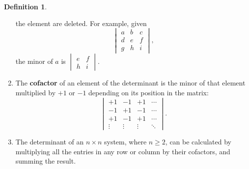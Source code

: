 \documentclass[a4paper,leqno]{article}
\numberwithin{equation}{section}
\theoremstyle{definition}
\newtheorem{defn}[equation]{Definition}
\theoremstyle{remark}
\newcommand{\df}[1]{\textbf{#1}}
\begin{document}
\begin{defn}
\begin{enumerate}
          the element are deleted. For example, given
          \begin{equation}
            \begin{vmatrix}
              a & b & c \\ d & e & f \\ g & h & i
            \end{vmatrix},
          \end{equation}
          the minor of $ a $ is $ \begin{vmatrix} e & f \\ h & i \end{vmatrix} $.
    \item The \df{cofactor} of an element of the determinant is the minor of that element multiplied by $ +1 $ or $ -1 $
          depending on its position in the matrix:
          \begin{equation}
            \begin{vmatrix}
              +1 & -1 & +1 & \cdots\\
              -1 & +1 & -1 & \cdots\\
              +1 & -1 & +1 & \cdots\\
                \vdots & \vdots & \vdots & \ddots
            \end{vmatrix}.
          \end{equation}
    \item The determinant of an $ n \times n $ system, where $ n \geq 2 $, can be calculated by multiplying all the entries in any row
          or column by their cofactors, and summing the result.
  \end{enumerate}
\end{defn}
\end{document}

